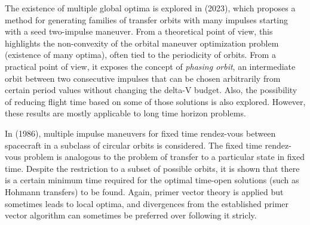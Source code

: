 The existence of multiple global optima is explored in \citeauthor{inf_many_optima} (2023), which proposes a method for generating families of transfer orbits with many impulses starting with a seed two-impulse maneuver. From a theoretical point of view, this highlights the non-convexity of the orbital maneuver optimization problem (existence of many optima), often tied to the periodicity of orbits. From a practical point of view, it exposes the concept of \textit{phasing orbit}, an intermediate orbit between two consecutive impulses that can be chosen arbitrarily from certain period values without changing the delta-V budget. Also, the possibility of reducing flight time based on some of those solutions is also explored. However, these results are mostly applicable to long time horizon problems.

In \citeauthor{multi_impulse_circ_rendezvous} (1986), multiple impulse maneuvers for fixed time rendez-vous between spacecraft in a subclass of circular orbits is considered. The fixed time rendez-vous problem is analogous to the problem of transfer to a particular state in fixed time. Despite the restriction to a subset of possible orbits, it is shown that there is a certain minimum time required for the optimal time-open solutions (such as Hohmann transfers) to be found. Again, primer vector theory is applied but sometimes leads to local optima, and divergences from the established primer vector algorithm can sometimes be preferred over following it stricly.




